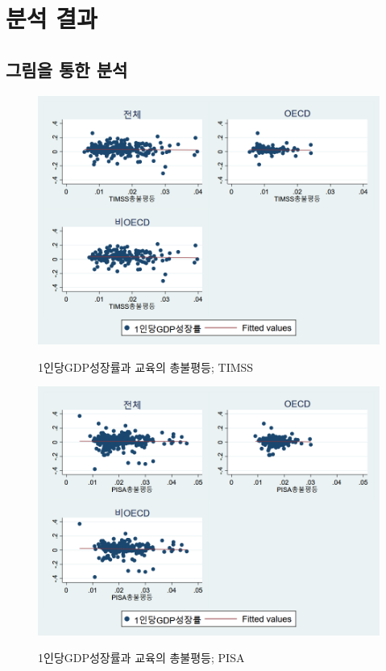 \section{분석 결과}
\subsection{그림을 통한 분석}

\begin{figure}
    \centering
    \caption{1인당GDP성장률과 교육의 총불평등; TIMSS}
    \includegraphics[width=\textwidth]{figure/scatter_pcgrowth_totmath_timss_noy.png}
    \label{fig:scatter_timss_pcgrowth_bjtmath_noy}
\end{figure}


\begin{figure}
    \centering
    \caption{1인당GDP성장률과 교육의 총불평등; PISA}
    \includegraphics[width=\textwidth]{figure/scatter_pcgrowth_totmath_pisa_noy.png}
    \label{fig:scatter_pisa_pcgrowth_bjtmath_noy}
\end{figure}

